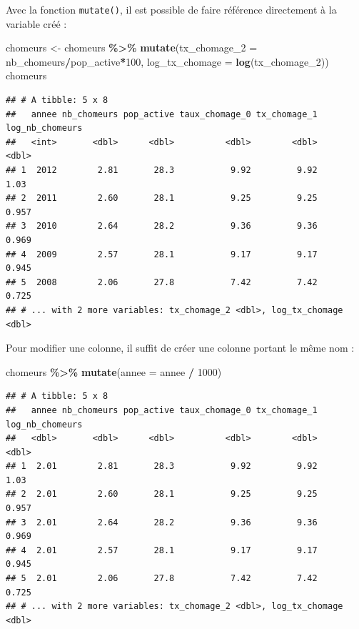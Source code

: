 \documentclass[
  11pt,
]{book}
\newenvironment{Shaded}{\begin{snugshade}}{\end{snugshade}}
\newcommand{\DataTypeTok}[1]{\textcolor[rgb]{0.13,0.29,0.53}{#1}}
\newcommand{\DecValTok}[1]{\textcolor[rgb]{0.00,0.00,0.81}{#1}}
\newcommand{\KeywordTok}[1]{\textcolor[rgb]{0.13,0.29,0.53}{\textbf{#1}}}
\newcommand{\NormalTok}[1]{#1}
\newcommand{\OperatorTok}[1]{\textcolor[rgb]{0.81,0.36,0.00}{\textbf{#1}}}
\newcommand{\StringTok}[1]{\textcolor[rgb]{0.31,0.60,0.02}{#1}}
\numberwithin{equation}{section}
\numberwithin{countremarque}{section}
\begin{document}
Avec la fonction \texttt{mutate()}, il est possible de faire référence directement à la variable créé :

\begin{Shaded}
\begin{Highlighting}[]
\NormalTok{chomeurs \textless{}{-}}\StringTok{ }
\StringTok{  }\NormalTok{chomeurs }\OperatorTok{\%\textgreater{}\%}\StringTok{ }
\StringTok{  }\KeywordTok{mutate}\NormalTok{(}\DataTypeTok{tx\_chomage\_2 =}\NormalTok{ nb\_chomeurs}\OperatorTok{/}\NormalTok{pop\_active}\OperatorTok{*}\DecValTok{100}\NormalTok{,}
         \DataTypeTok{log\_tx\_chomage =} \KeywordTok{log}\NormalTok{(tx\_chomage\_}\DecValTok{2}\NormalTok{))}
\NormalTok{chomeurs}
\end{Highlighting}
\end{Shaded}

\begin{lstlisting}
## # A tibble: 5 x 8
##   annee nb_chomeurs pop_active taux_chomage_0 tx_chomage_1 log_nb_chomeurs
##   <int>       <dbl>      <dbl>          <dbl>        <dbl>           <dbl>
## 1  2012        2.81       28.3           9.92         9.92           1.03 
## 2  2011        2.60       28.1           9.25         9.25           0.957
## 3  2010        2.64       28.2           9.36         9.36           0.969
## 4  2009        2.57       28.1           9.17         9.17           0.945
## 5  2008        2.06       27.8           7.42         7.42           0.725
## # ... with 2 more variables: tx_chomage_2 <dbl>, log_tx_chomage <dbl>
\end{lstlisting}

Pour modifier une colonne, il suffit de créer une colonne portant le même nom :

\begin{Shaded}
\begin{Highlighting}[]
\NormalTok{chomeurs }\OperatorTok{\%\textgreater{}\%}\StringTok{ }
\StringTok{  }\KeywordTok{mutate}\NormalTok{(}\DataTypeTok{annee =}\NormalTok{ annee }\OperatorTok{/}\StringTok{ }\DecValTok{1000}\NormalTok{)}
\end{Highlighting}
\end{Shaded}

\begin{lstlisting}
## # A tibble: 5 x 8
##   annee nb_chomeurs pop_active taux_chomage_0 tx_chomage_1 log_nb_chomeurs
##   <dbl>       <dbl>      <dbl>          <dbl>        <dbl>           <dbl>
## 1  2.01        2.81       28.3           9.92         9.92           1.03 
## 2  2.01        2.60       28.1           9.25         9.25           0.957
## 3  2.01        2.64       28.2           9.36         9.36           0.969
## 4  2.01        2.57       28.1           9.17         9.17           0.945
## 5  2.01        2.06       27.8           7.42         7.42           0.725
## # ... with 2 more variables: tx_chomage_2 <dbl>, log_tx_chomage <dbl>
\end{lstlisting}
\end{document}
